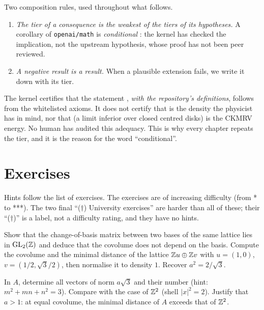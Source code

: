 Two composition rules, used throughout what follows.
\begin{enumerate}
\item \emph{The tier of a consequence is the weakest of the tiers of its hypotheses.} A corollary of \texttt{openai/math} is \emph{conditional} \tierA{}: the kernel has
checked the implication, not the upstream hypothesis, whose proof has not been peer reviewed.
\item \emph{A negative result is a result.} When a plausible extension fails, we write it down with its tier.
\end{enumerate}

\begin{warnbox}
The kernel certifies that the statement , \emph{with the repository's definitions}, follows from the whitelisted axioms. It does not certify
that  is the density the physicist has in mind, nor that  (a limit inferior over closed centred disks) is the CKMRV energy. No human
has audited this adequacy. This is why every chapter repeats the tier, and it is the reason for the word ``conditional''.
\end{warnbox}

\section*{Exercises}
\label{ch1:sec:exos}

Hints follow the list of exercises. The exercises are of increasing difficulty (from * to ***). The two final
``($\dagger$) University exercises'' are harder than all of these; their ``($\dagger$)'' is a label, not a difficulty rating, and they have no hints.

\begin{exercise}[*]\label{ch1:ex:covol}
Show that the change-of-basis matrix between two bases of the same lattice lies in $\mathrm{GL}_2(\mathbb{Z})$ and deduce that the covolume does not depend on the basis.
Compute the covolume and the minimal distance of the lattice $\mathbb{Z} u\oplus\mathbb{Z} v$ with $u=(1,0)$, $v=(1/2,\sqrt3/2)$, then normalise it to density $1$. Recover $a^2=2/\sqrt3$.
\end{exercise}

\begin{exercise}[*]\label{ch1:ex:voisins}
In $A$, determine all vectors of norm $a\sqrt3$ and their number (hint: $m^2+mn+n^2=3$). Compare with the case of $\mathbb{Z}^2$ (shell $|x|^2=2$). Justify that $a>1$: at equal covolume, the minimal distance of $A$ exceeds that of $\mathbb{Z}^2$.
\end{exercise}

